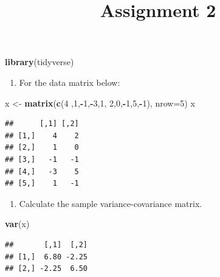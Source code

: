 \documentclass[]{article}
\title{Assignment 2}
\author{}
\date{}
\newenvironment{Shaded}{\begin{snugshade}}{\end{snugshade}}
\newcommand{\DataTypeTok}[1]{\textcolor[rgb]{0.13,0.29,0.53}{#1}}
\newcommand{\DecValTok}[1]{\textcolor[rgb]{0.00,0.00,0.81}{#1}}
\newcommand{\KeywordTok}[1]{\textcolor[rgb]{0.13,0.29,0.53}{\textbf{#1}}}
\newcommand{\NormalTok}[1]{#1}
\newcommand{\OperatorTok}[1]{\textcolor[rgb]{0.81,0.36,0.00}{\textbf{#1}}}
\newcommand{\StringTok}[1]{\textcolor[rgb]{0.31,0.60,0.02}{#1}}
\providecommand{\tightlist}{%
  \setlength{\itemsep}{0pt}\setlength{\parskip}{0pt}}
\begin{document}
\maketitle

\begin{Shaded}
\begin{Highlighting}[]
\KeywordTok{library}\NormalTok{(tidyverse)}
\end{Highlighting}
\end{Shaded}

\begin{enumerate}
\def\labelenumi{\arabic{enumi}.}
\tightlist
\item
  For the data matrix below:
\end{enumerate}

\begin{Shaded}
\begin{Highlighting}[]
\NormalTok{x <-}\StringTok{ }\KeywordTok{matrix}\NormalTok{(}\KeywordTok{c}\NormalTok{(}\DecValTok{4}\NormalTok{ ,}\DecValTok{1}\NormalTok{,}\OperatorTok{-}\DecValTok{1}\NormalTok{,}\OperatorTok{-}\DecValTok{3}\NormalTok{,}\DecValTok{1}\NormalTok{, }\DecValTok{2}\NormalTok{,}\DecValTok{0}\NormalTok{,}\OperatorTok{-}\DecValTok{1}\NormalTok{,}\DecValTok{5}\NormalTok{,}\OperatorTok{-}\DecValTok{1}\NormalTok{), }\DataTypeTok{nrow=}\DecValTok{5}\NormalTok{)}
\NormalTok{x}
\end{Highlighting}
\end{Shaded}

\begin{verbatim}
##      [,1] [,2]
## [1,]    4    2
## [2,]    1    0
## [3,]   -1   -1
## [4,]   -3    5
## [5,]    1   -1
\end{verbatim}

\begin{enumerate}
\def\labelenumi{(\alph{enumi})}
\tightlist
\item
  Calculate the sample variance-covariance matrix.
\end{enumerate}

\begin{Shaded}
\begin{Highlighting}[]
\KeywordTok{var}\NormalTok{(x)}
\end{Highlighting}
\end{Shaded}

\begin{verbatim}
##       [,1]  [,2]
## [1,]  6.80 -2.25
## [2,] -2.25  6.50
\end{verbatim}
\end{document}
